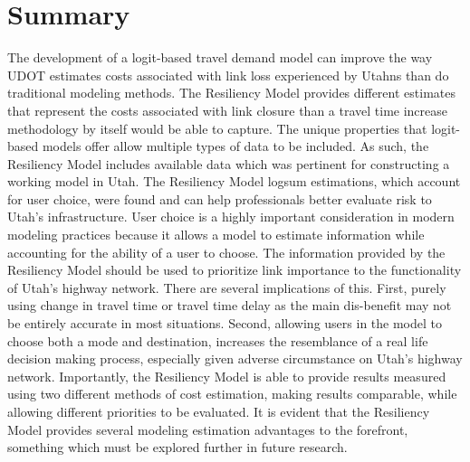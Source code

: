 \section{Summary}

The development of a logit-based travel demand model can improve the way UDOT
estimates costs associated with link loss experienced by Utahns than do traditional modeling methods. The Resiliency Model provides different
estimates that represent the costs associated with link
closure than a travel time increase methodology by itself would be able to
capture. The unique properties that logit-based models offer allow multiple types
of data to be included. As such, the Resiliency Model includes available data which
was pertinent for constructing a working model in Utah. The Resiliency Model logsum estimations, which account for user choice, were
found and can help professionals better evaluate risk to Utah’s
infrastructure. User choice is a highly important consideration in modern modeling
practices because it allows a model to estimate information while accounting for the ability of a user to choose. The information
provided by the Resiliency Model
should be used to prioritize link importance to the functionality of
Utah’s highway network. There are several implications of this. First, purely
using change in travel time or travel time delay as the main dis-benefit may not
be entirely accurate in most situations. Second, allowing users in the model
to choose both a mode and destination, increases the resemblance of a real life
decision making process, especially given adverse circumstance on Utah's
highway network. Importantly, the Resiliency Model is able to provide results measured
using two different methods of cost estimation, making results comparable, while allowing different priorities to be evaluated. It is evident that the Resiliency Model provides several
modeling estimation advantages to the forefront, something which must be
explored further in future research.
